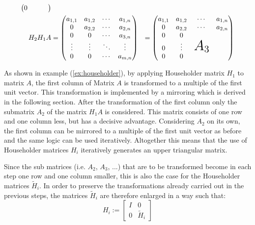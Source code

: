 \begin{example}
\begin{subequations}
\begin{align*}
\begin{pmatrix}
		0		& 		  &  	   & 
		\end{pmatrix}\\
		H_2 H_1 A &= 
		\begin{pmatrix}
		a_{1,1} & a_{1,2} & \cdots & a_{1,n} \\
		0		& a_{2,2} & \cdots & a_{2,n} \\
		0		& 0		  & \cdots & a_{3,n} \\
		\vdots  & \vdots  & \ddots & \vdots  \\
		0		& 0		  & \cdots & a_{m,n} 
		\end{pmatrix}
		&= 
		\begin{pmatrix}
		a_{1,1} & a_{1,2} & \cdots & a_{1,n} \\
		0 		& a_{2,2} &	\cdots & a_{2,n} \\
		0 		& 0		  &		   &  \\
		0  		& \vdots  & \text{\huge$A_3$} &   \\
		0		& 0		  &  	   & 
		\end{pmatrix}
		\end{align*}
	\end{subequations}
\end{example}

As shown in example (\ref{ex:householder}), by applying Householder matrix $H_1$ to matrix $A$, the first column of Matrix $A$ is transformed to a multiple of the first unit vector. This transformation is implemented by a mirroring which is derived in the following section. After the transformation of the first column only the submatrix $A_2$ of the matrix $H_1A$ is considered. This matrix consists of one row and one column less, but has a decisive advantage. Considering $A_2$ on its own, the first column can be mirrored to a multiple of the first unit vector as before and the same logic can be used iteratively. Altogether this means that the use of Householder matrices $H_i$ iteratively generates an upper triangular matrix.

\begin{remark}
	Since the sub matrices (i.e. $A_2$, $A_3$, ...) that are to be transformed become in each step one row and one column smaller, this is also the case for the Householder matrices $\tilde{H}_i$. In order to preserve the transformations already carried out in the previous steps, the matrices $\tilde{H}_i$ are therefore enlarged in a way such that:
	\begin{equation*}
		H_i := \left[
		\begin{array}{cc}
		I & 0 \\
		0 & \tilde{H}_i
		\end{array}
		\right]
	\end{equation*}
\end{remark}

